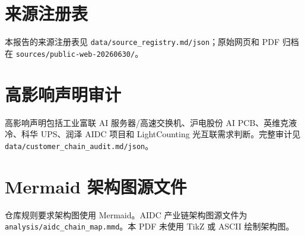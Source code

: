 \section*{来源注册表}
本报告的来源注册表见 \texttt{data/source\_registry.md/json}；原始网页和 PDF 归档在 \texttt{sources/public-web-20260630/}。

\section*{高影响声明审计}
高影响声明包括工业富联 AI 服务器/高速交换机、沪电股份 AI PCB、英维克液冷、科华 UPS、润泽 AIDC 项目和 LightCounting 光互联需求判断。完整审计见 \texttt{data/customer\_chain\_audit.md/json}。

\section*{Mermaid 架构图源文件}
仓库规则要求架构图使用 Mermaid。AIDC 产业链架构图源文件为 \texttt{analysis/aidc\_chain\_map.mmd}。本 PDF 未使用 TikZ 或 ASCII 绘制架构图。
